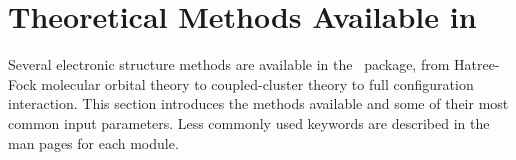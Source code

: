 \section{Theoretical Methods Available in \PSIthree}

Several electronic structure methods are available in the \PSIthree\
package, from Hatree-Fock molecular orbital theory to coupled-cluster
theory to full configuration interaction.  This section introduces
the methods available and some of their most common input parameters.
Less commonly used keywords are described in the man pages for each
module.
 
